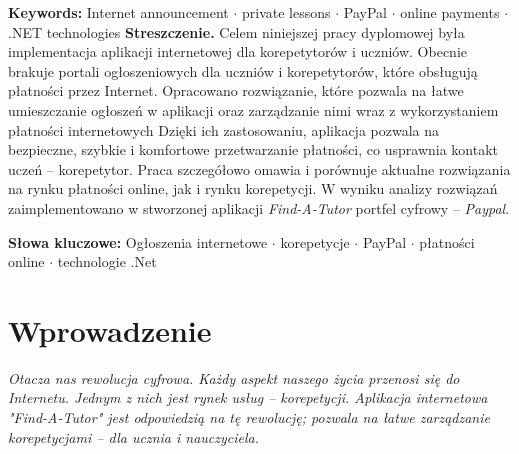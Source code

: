\documentclass[12pt]{article}
\numberwithin{figure}{section}
\begin{document}
\begin{sloppypar}
\textbf{Keywords:}
Internet announcement $\cdot$ private lessons $\cdot$ PayPal $\cdot$ online payments $\cdot$ .NET technologies
\bigbreak
\textbf{Streszczenie.} 
Celem niniejszej pracy dyplomowej była implementacja aplikacji internetowej dla korepetytorów i uczniów.
Obecnie brakuje portali ogłoszeniowych dla uczniów i korepetytorów, które obsługują płatności przez Internet.
Opracowano rozwiązanie, które pozwala na łatwe umieszczanie ogłoszeń w aplikacji oraz zarządzanie nimi wraz z wykorzystaniem płatności internetowych
Dzięki ich zastosowaniu, aplikacja pozwala na bezpieczne, szybkie i komfortowe przetwarzanie płatności, co usprawnia kontakt uczeń -- korepetytor.
Praca szczegółowo omawia i porównuje aktualne rozwiązania na rynku płatności online, jak i rynku korepetycji. 
W wyniku analizy rozwiązań zaimplementowano w stworzonej aplikacji \textit{Find-A-Tutor} portfel cyfrowy -- \textit{Paypal}.
    
\textbf{Słowa kluczowe:}
Ogłoszenia internetowe $\cdot$ korepetycje $\cdot$ PayPal $\cdot$ płatności online $\cdot$ technologie .Net

\pagebreak
\section{Wprowadzenie}
\textit{Otacza nas rewolucja cyfrowa. Każdy aspekt naszego życia przenosi się do Internetu. Jednym z nich jest rynek usług -- korepetycji. Aplikacja internetowa "Find-A-Tutor" jest odpowiedzią na tę rewolucję; pozwala na łatwe zarządzanie korepetycjami -- dla ucznia i nauczyciela.}

\end{sloppypar}
\end{document}
